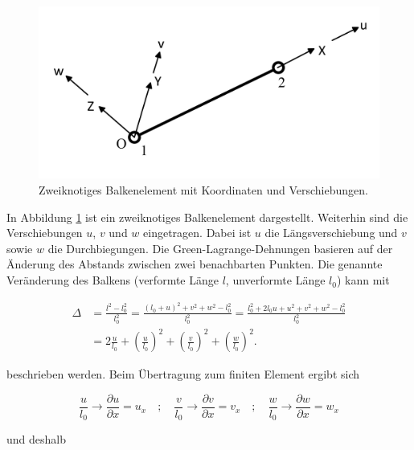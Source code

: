 	\begin{figure}[H]
		\centering
		\includegraphics[width=0.74\linewidth, height=0.23\textheight]{Theoretische_Grundlagen/2_Knote_Element}
		\caption{Zweiknotiges Balkenelement mit Koordinaten und Verschiebungen.}
		\label{fig:2-Knote-Element-Koordinate}
	\end{figure}
	
	In Abbildung \ref{fig:2-Knote-Element-Koordinate} ist ein zweiknotiges Balkenelement dargestellt. Weiterhin sind die Verschiebungen $ u $, $ v $ und $ w $ eingetragen. Dabei ist $ u $ die Längsverschiebung und $ v $ sowie $ w $ die Durchbiegungen. Die Green-Lagrange-Dehnungen basieren auf der Änderung des Abstands zwischen zwei benachbarten Punkten. Die genannte Veränderung des Balkens (verformte Länge $ l $, unverformte Länge $ l_{0} $) kann mit
	
	\begin{equation}\label{equ:Änderung der Quadrate}
	\begin{aligned}
	\Delta & = \frac{l^{2}-l_{0}^{2}}{l_{0}^{2}} = \frac{(l_{0}+u)^{2}+v^{2}+w^{2}-l_{0}^{2}}{l_{0}^{2}} = \frac{l_{0}^{2}+2l_{0}u+u^{2}+v^{2}+w^{2}-l_{0}^{2}}{l_{0}^{2}} \\
	       & = 2\frac{u}{l_{0}}+\left(\frac{u}{l_{0}}\right)^{2}+\left(\frac{v}{l_{0}}\right)^{2}+\left(\frac{w}{l_{0}}\right)^{2} .
	\end{aligned}
	\end{equation}
	
	beschrieben werden. Beim Übertragung zum finiten Element ergibt sich
	
	\begin{equation}\label{equ:Übergang zum dx bei Dehnung}
	\frac{u}{l_{0}} \rightarrow \frac{\partial u}{\partial x}=u_{x} \quad \mathrm{;} \quad \frac{v}{l_{0}} \rightarrow \frac{\partial v}{\partial x} = v_{x} \quad \mathrm{;}  \quad \frac{w}{l_{0}} \rightarrow \frac{\partial w}{\partial x}=w_{x}
	\end{equation}
	
	und deshalb
	

